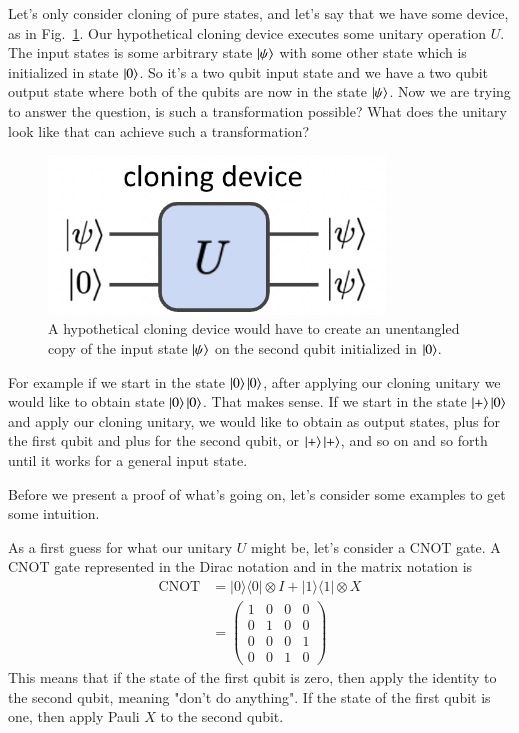 Let's only consider cloning of pure states, and let's say that we have some device, as in Fig.~\ref{fig:cloner}. Our hypothetical cloning device executes some unitary operation $U$. The input states is some arbitrary state $\left| \psi \right\rangle$ with some other state which is initialized in state $\left| 0 \right\rangle$. So it's a two qubit input state and we have a two qubit output state where both of the qubits are now in the state $\left| \psi \right\rangle$. Now we are trying to answer the question, is such a transformation possible? What does the unitary look like that can achieve such a transformation?
\begin{figure}[H]
    \centering
    \includegraphics[width=0.8\textwidth]{lesson8/cloning-device.png}
        \caption{A hypothetical cloning device would have to create an unentangled copy of the input state $\left| \psi \right\rangle$ on the second qubit initialized in $\left| 0 \right\rangle$.}
    \label{fig:cloner}
\end{figure}

For example if we start in the state $\left| 0 \right\rangle\left| 0 \right\rangle$, after applying our cloning unitary we would like to obtain state $\left| 0 \right\rangle\left| 0 \right\rangle$. That makes sense. If we start in the state $\left| + \right\rangle\left| 0 \right\rangle$ and apply our cloning unitary, we would like to obtain as output states, plus for the first qubit and plus for the second qubit, or $\left| + \right\rangle\left| + \right\rangle$, and so on and so forth until it works for a general input state.

Before we present a proof of what's going on, let's consider some examples to get some intuition.

As a first guess for what our unitary $U$ might be, let's consider a CNOT gate. A CNOT gate represented in the Dirac notation and in the matrix notation is
\begin{equation}
\begin{aligned}
\operatorname{CNOT} &=|0\rangle\langle 0|\otimes I+| 1\rangle\langle 1| \otimes X \\
&=\left(\begin{array}{llll}
1 & 0 & 0 & 0 \\
0 & 1 & 0 & 0 \\
0 & 0 & 0 & 1 \\
0 & 0 & 1 & 0
\end{array}\right)
\end{aligned}
\end{equation}
This means that if the state of the first qubit is zero, then apply the identity to the second qubit, meaning "don't do anything". If the state of the first qubit is one, then apply Pauli $X$ to the second qubit.

